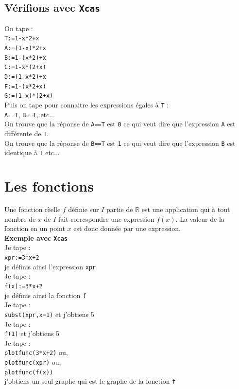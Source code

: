 \documentclass[a4paper,11pt]{book}
\begin{document}
\subsection{V\'erifions avec {\tt Xcas}}
On tape :\\
{\tt T:=1-x*2+x}\\
{\tt A:=(1-x)*2+x}\\
{\tt B:=1-(x*2)+x}\\
{\tt C:=1-x*(2+x)}\\
{\tt D:=(1-x*2)+x}\\
{\tt F:=1-(x*2+x)}\\
{\tt G:=(1-x)*(2+x)}\\
Puis on tape pour connaitre les expressions \'egales \`a {\tt T} :\\
{\tt A==T}, {\tt B==T}, etc...\\
On trouve que la r\'eponse de {\tt A==T} est {\tt  0} ce qui veut dire que 
l'expression {\tt A} est diff\'erente de {\tt T}.\\
On trouve que la r\'eponse de {\tt B==T} est {\tt  1} ce qui veut dire que 
l'expression {\tt B} est identique \`a {\tt T} etc...
\section{Les fonctions}
Une fonction r\`eelle $f$ d\'efinie sur $I$ partie de $\mathbb R$ 
est une application qui \`a tout 
nombre de $x$ de $I$ fait correspondre une expression $f(x)$.
La valeur de la fonction en un point $x$ est donc donn\'ee par une 
expression.\\
{\bf Exemple avec {\tt Xcas}}\\
Je tape :\\
{\tt xpr:=3*x+2}\\
je d\'efinis ainsi l'expression {\tt xpr}\\
Je tape :\\
{\tt f(x):=3*x+2}\\ 
je d\'efinis ainsi la fonction {\tt f}\\
Je tape :\\
{\tt subst(xpr,x=1)} et j'obtiens 5\\
Je tape :\\
{\tt f(1)} et j'obtiens 5\\
Je tape :\\
{\tt plotfunc(3*x+2)} ou,\\
{\tt plotfunc(xpr)} ou,\\ 
{\tt plotfunc(f(x))}\\ 
j'obtiens un seul graphe qui est le graphe de la fonction {\tt f}
\end{document}

